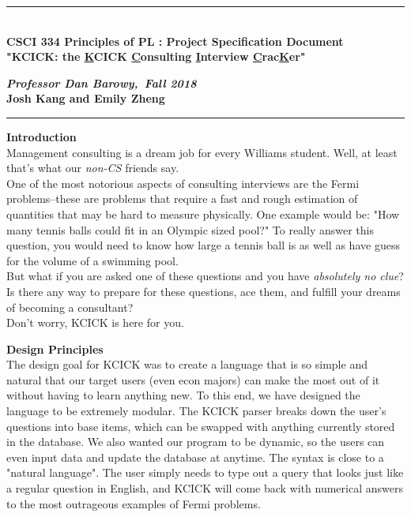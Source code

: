 \documentclass{article}
\newcounter{partCounter}
\newcommand{\hmwkTitle}{Project Specification Document}
\newcommand{\hmwkClass}{CSCI 334 Principles of PL }
\newcommand{\hmwkClassInstructor}{Professor Dan Barowy}
\renewcommand{\maketitle}{\bgroup\vspace*{-0.75in}
\setlength{\parindent}{0pt}
\begin{center}
\vspace{220 pt}
\noindent\rule{6.5in}{0.6pt}\\[5mm]
{\Large\textbf{\hmwkClass: \hmwkTitle}}\\[2mm]
\vspace{40pt}
{\fontfamily{qcr}\selectfont
\Large{\textbf{"KCICK: the \underline{K}CICK  \underline{C}onsulting \underline{I}nterview \underline{C}rac\underline{K}er" \\}}
}
\vspace{40pt}

\textbf{\textit{ \hmwkClassInstructor ,\ Fall 2018}} \\[5mm]
\textbf{Josh Kang and Emily Zheng $\;$}\\
\vspace{10pt}
\noindent\rule{6.5in}{0.6pt}
\end{center}\egroup
}
\begin{document}
\thispagestyle{plain}
\maketitle
\renewcommand{\part}[1]{\textbf{\large Part
\Alph{partCounter}}\stepcounter{partCounter}\\}

\newpage
{}\selectfont
\vspace{20pt}
{\large \textbf{Introduction }} \\

Management consulting is a dream job for every Williams student. Well, at least that's what our \textit{non-CS} friends say.\\ 

One of the most notorious aspects of consulting interviews are the Fermi problems--these are problems that require a fast and rough estimation of quantities that may be hard to measure physically. One example would be: "How many tennis balls could fit in an Olympic sized pool?" To really answer this question, you would need to know how large a tennis ball is as well as have guess for the volume of a swimming pool. \\

But what if you are asked one of these questions and you have \emph{absolutely no clue}? Is there any way to prepare for these questions, ace them, and  fulfill your dreams of becoming a consultant?\\

Don't worry, KCICK is here for you.\\


\vspace{ 30pt}

{\large{\textbf{Design Principles }}}\\

The design goal for KCICK was to create a language that is so simple and natural that our target users {\footnotesize (even econ majors)} can make the most out of it without having to learn anything new. To this end, we have designed the language to be extremely modular. The KCICK parser breaks down the user's questions into base items, which can be swapped with anything currently stored in the database. We also wanted our program to be dynamic, so the users can even input data and update the database at anytime.  The syntax is close to a "natural language". The user simply needs to type out a query that looks just like a regular question in English, and KCICK will come back with numerical answers to the most outrageous examples of Fermi problems.  \\
\end{document}
